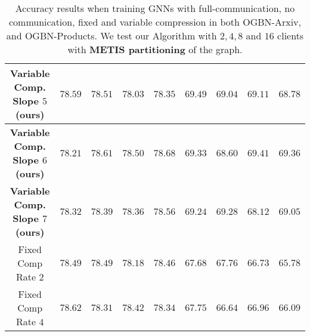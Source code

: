 \begin{table*}
\begin{tabular}{c|cccccccc}
\textbf{Variable Comp. Slope $5$(ours)}& \multicolumn{1}{c|}{$78.59$} & \multicolumn{1}{c|}{$78.51$} & \multicolumn{1}{c|}{$78.03$} & \multicolumn{1}{c|}{$78.35$} & \multicolumn{1}{c|}{$69.49$} & \multicolumn{1}{c|}{$69.04$} & \multicolumn{1}{c|}{$69.11$} & \multicolumn{1}{c}{$68.78$} \\ \hline
\textbf{Variable Comp. Slope $6$(ours)}& \multicolumn{1}{c|}{$78.21$} & \multicolumn{1}{c|}{$78.61$} & \multicolumn{1}{c|}{$78.50$} & \multicolumn{1}{c|}{$78.68$} & \multicolumn{1}{c|}{$69.33$} & \multicolumn{1}{c|}{$68.60$} & \multicolumn{1}{c|}{$69.41$} & \multicolumn{1}{c}{$69.36$} \\ \hline
\textbf{Variable Comp. Slope $7$(ours)}& \multicolumn{1}{c|}{$78.32$} & \multicolumn{1}{c|}{$78.39$} & \multicolumn{1}{c|}{$78.36$} & \multicolumn{1}{c|}{$78.56$} & \multicolumn{1}{c|}{$69.24$} & \multicolumn{1}{c|}{$69.28$} & \multicolumn{1}{c|}{$68.12$} & \multicolumn{1}{c}{$69.05$} \\ \hline
Fixed Comp Rate $2$& \multicolumn{1}{c|}{$78.49$} & \multicolumn{1}{c|}{$78.49$} & \multicolumn{1}{c|}{$78.18$} & \multicolumn{1}{c|}{$78.46$} & \multicolumn{1}{c|}{$67.68$} & \multicolumn{1}{c|}{$67.76$} & \multicolumn{1}{c|}{$66.73$} & \multicolumn{1}{c}{$65.78$} \\ \hline
Fixed Comp Rate $4$& \multicolumn{1}{c|}{$78.62$} & \multicolumn{1}{c|}{$78.31$} & \multicolumn{1}{c|}{$78.42$} & \multicolumn{1}{c|}{$78.34$} & \multicolumn{1}{c|}{$67.75$} & \multicolumn{1}{c|}{$66.64$} & \multicolumn{1}{c|}{$66.96$} & \multicolumn{1}{c}{$66.09$} \\ \hline
\end{tabular}
\caption{\label{table:results_metis} Accuracy results when training GNNs with full-communication, no communication, fixed and variable compression in both OGBN-Arxiv, and OGBN-Products. We test our Algorithm with $2,4,8$ and $16$ clients with \textbf{METIS partitioning} of the graph. }
\end{table*}